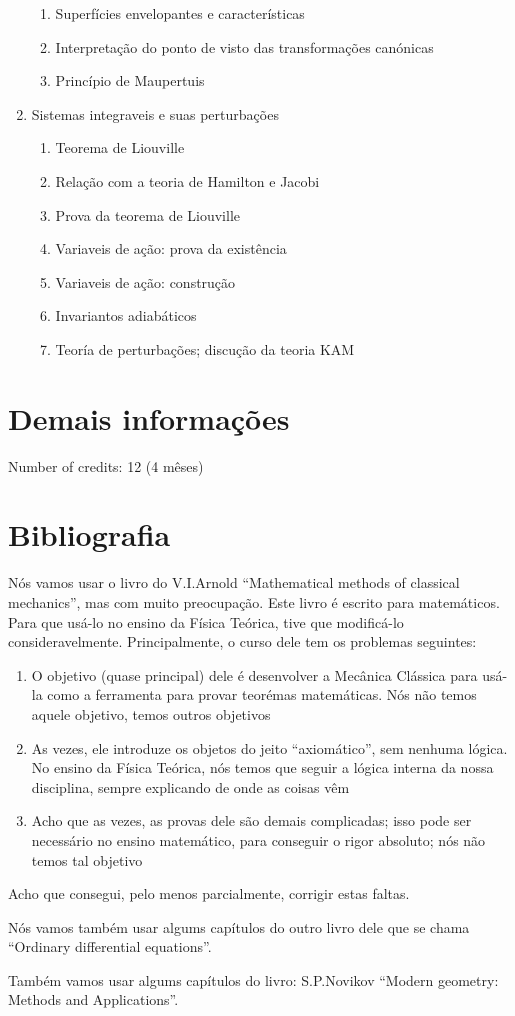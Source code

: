 \documentclass[12pt]{article}
\begin{document}
\begin{enumerate}
\begin{enumerate}
   \item Superfícies envelopantes e características
   \item Interpretação do ponto de visto das transformações canónicas
   \item Princípio de Maupertuis
   \end{enumerate}
\item Sistemas integraveis e suas perturbações
   \begin{enumerate}
   \item Teorema de Liouville
   \item Relação com a teoria de Hamilton e Jacobi
   \item Prova da teorema de Liouville
   \item Variaveis de ação: prova da existência
   \item Variaveis de ação: construção
   \item Invariantos adiabáticos
   \item Teoría de perturbações; discução da teoria KAM
   \end{enumerate}
\end{enumerate}

\section{Demais informações}
Number of credits: 12 (4 mêses)

\section{Bibliografia}
Nós vamos usar o livro do V.I.Arnold 
``Mathematical methods of classical mechanics'', mas com muito preocupação. 
Este livro é escrito para matemáticos. Para que usá-lo no ensino da Física 
Teórica, tive que modificá-lo consideravelmente. Principalmente, o curso dele
tem os problemas seguintes:
\begin{enumerate}
\item O objetivo (quase principal) dele é desenvolver a Mecânica Clássica
   para usá-la como a ferramenta para provar teorémas matemáticas. Nós não
   temos aquele objetivo, temos outros objetivos
\item As vezes, ele introduze os objetos do jeito ``axiomático'', sem nenhuma
   lógica. No ensino da Física Teórica, nós temos que seguir a lógica interna
   da nossa disciplina, sempre explicando de onde as coisas vêm
\item Acho que as vezes, as provas dele são demais complicadas; isso pode ser
   necessário no ensino matemático, para conseguir o rigor absoluto; nós não
   temos tal objetivo
\end{enumerate}
Acho que consegui, pelo menos parcialmente, corrigir estas faltas. 

Nós vamos também usar algums capítulos do outro livro dele que se chama 
``Ordinary differential equations''. 

Também vamos usar algums capítulos do livro: S.P.Novikov 
``Modern geometry: Methods and Applications''.
\end{document}
